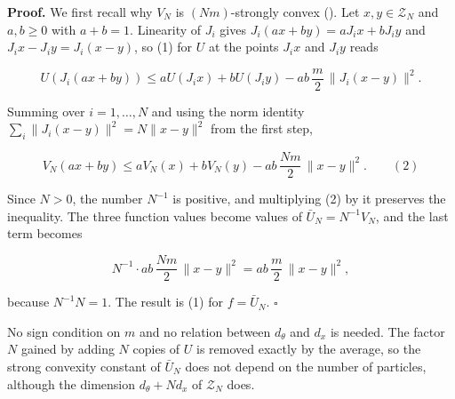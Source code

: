 \documentclass[11pt,a4paper]{report}
\begin{document}
\textbf{Proof.} We first recall why \(V_N\) is \((Nm)\)-strongly convex (\cite[Section~3.1.3]{LangevinLean2026IPLA}). Let \(x,y\in\mathcal Z_N\) and \(a,b\ge0\) with \(a+b=1\). Linearity of \(J_i\) gives \(J_i(ax+by)=aJ_ix+bJ_iy\) and \(J_ix-J_iy=J_i(x-y)\), so (1) for \(U\) at the points \(J_ix\) and \(J_iy\) reads


\[U(J_i(ax+by))\le aU(J_ix)+bU(J_iy)-ab\,\frac m2\,\|J_i(x-y)\|^2.\]


Summing over \(i=1,\dots,N\) and using the norm identity \(\sum_i\|J_i(x-y)\|^2=N\|x-y\|^2\) from the first step,


\[V_N(ax+by)\le aV_N(x)+bV_N(y)-ab\,\frac{Nm}2\,\|x-y\|^2.\qquad(2)\]


Since \(N>0\), the number \(N^{-1}\) is positive, and multiplying (2) by it preserves the inequality. The three function values become values of \(\bar U_N=N^{-1}V_N\), and the last term becomes


\[N^{-1}\cdot ab\,\frac{Nm}2\,\|x-y\|^2=ab\,\frac m2\,\|x-y\|^2,\]


because \(N^{-1}N=1\). The result is (1) for \(f=\bar U_N\). \(\square\)




No sign condition on \(m\) and no relation between \(d_\theta\) and \(d_x\) is needed. The factor \(N\) gained by adding \(N\) copies of \(U\) is removed exactly by the average, so the strong convexity constant of \(\bar U_N\) does not depend on the number of particles, although the dimension \(d_\theta+Nd_x\) of \(\mathcal Z_N\) does.
\end{document}

